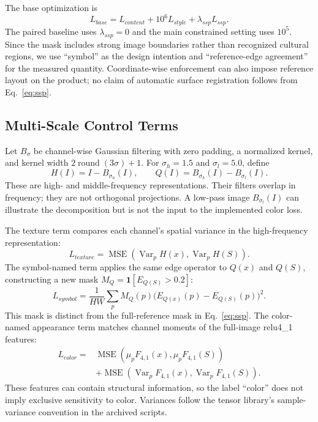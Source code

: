 \documentclass[manuscript,acmlarge,screen,review]{acmart}
\begin{document}
The base optimization is
\begin{equation}
L_{base}=L_{content}+10^6 L_{style}+\lambda_{ssp}L_{ssp}.
\end{equation}
The paired baseline uses $\lambda_{ssp}=0$ and the main constrained setting uses $10^5$. Since the mask includes strong image boundaries rather than recognized cultural regions, we use ``symbol'' as the design intention and ``reference-edge agreement'' for the measured quantity. Coordinate-wise enforcement can also impose reference layout on the product; no claim of automatic surface registration follows from Eq.~\ref{eq:ssp}.

\subsection{Multi-Scale Control Terms}
Let $B_\sigma$ be channel-wise Gaussian filtering with zero padding, a normalized kernel, and kernel width $2\operatorname{round}(3\sigma)+1$. For $\sigma_h=1.5$ and $\sigma_l=5.0$, define
\begin{equation}
H(I)=I-B_{\sigma_h}(I),\qquad
Q(I)=B_{\sigma_h}(I)-B_{\sigma_l}(I).
\end{equation}
These are high- and middle-frequency representations. Their filters overlap in frequency; they are not orthogonal projections. A low-pass image $B_{\sigma_l}(I)$ can illustrate the decomposition but is not the input to the implemented color loss.

The texture term compares each channel's spatial variance in the high-frequency representation:
\begin{equation}
L_{texture}=\operatorname{MSE}(\operatorname{Var}_{p}H(x),\operatorname{Var}_{p}H(S)).
\end{equation}
The symbol-named term applies the same edge operator to $Q(x)$ and $Q(S)$, constructing a new mask $M_Q=\mathbf{1}[E_{Q(S)}>0.2]$:
\begin{equation}
L_{symbol}=\frac{1}{HW}\sum_p M_Q(p)\big(E_{Q(x)}(p)-E_{Q(S)}(p)\big)^2.
\end{equation}
This mask is distinct from the full-reference mask in Eq.~\ref{eq:ssp}. The color-named appearance term matches channel moments of the full-image relu4\_1 features:
\begin{align}
L_{color}={}&\operatorname{MSE}(\mu_p F_{4,1}(x),\mu_p F_{4,1}(S))\nonumber\\
&+\operatorname{MSE}(\operatorname{Var}_p F_{4,1}(x),\operatorname{Var}_p F_{4,1}(S)).
\end{align}
These features can contain structural information, so the label ``color'' does not imply exclusive sensitivity to color. Variances follow the tensor library's sample-variance convention in the archived scripts.
\end{document}
